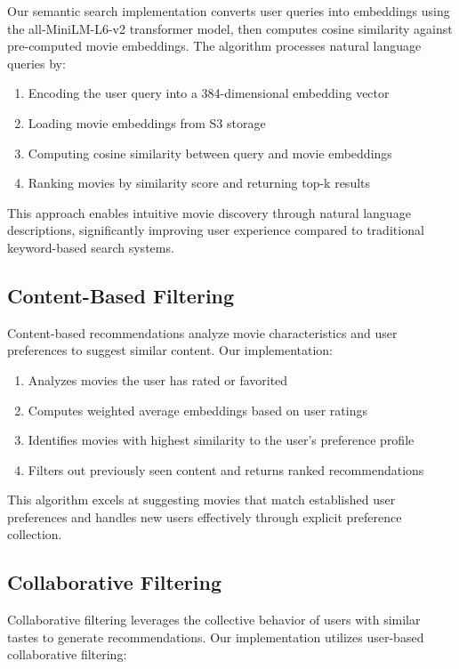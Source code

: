\documentclass[conference]{IEEEtran}
\begin{document}
Our semantic search implementation converts user queries into embeddings using the all-MiniLM-L6-v2 transformer model, then computes cosine similarity against pre-computed movie embeddings. The algorithm processes natural language queries by:

\begin{enumerate}
\item Encoding the user query into a 384-dimensional embedding vector
\item Loading movie embeddings from S3 storage
\item Computing cosine similarity between query and movie embeddings
\item Ranking movies by similarity score and returning top-k results
\end{enumerate}

This approach enables intuitive movie discovery through natural language descriptions, significantly improving user experience compared to traditional keyword-based search systems.

\subsection{Content-Based Filtering}

Content-based recommendations analyze movie characteristics and user preferences to suggest similar content. Our implementation:

\begin{enumerate}
\item Analyzes movies the user has rated or favorited
\item Computes weighted average embeddings based on user ratings
\item Identifies movies with highest similarity to the user's preference profile
\item Filters out previously seen content and returns ranked recommendations
\end{enumerate}

This algorithm excels at suggesting movies that match established user preferences and handles new users effectively through explicit preference collection.

\subsection{Collaborative Filtering}

Collaborative filtering leverages the collective behavior of users with similar tastes to generate recommendations. Our implementation utilizes user-based collaborative filtering:
\end{document}
